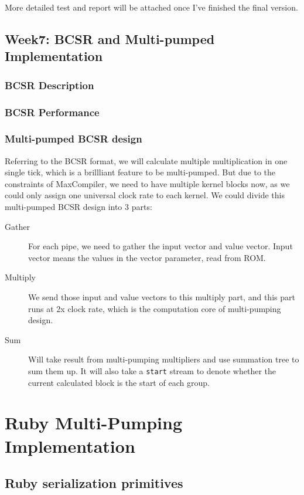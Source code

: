 \documentclass[a4paper, 10pt]{article}
\begin{document}
More detailed test and report will be attached once I've finished the final version.

\subsection{Week7: BCSR and Multi-pumped Implementation}

\subsubsection{BCSR Description}

\subsubsection{BCSR Performance}

\subsubsection{Multi-pumped BCSR design}

Referring to the BCSR format, we will calculate multiple multiplication in one single tick, which is a brillliant feature to be multi-pumped. But due to the constraints of MaxCompiler, we need to have multiple kernel blocks now, as we could only assign one universal clock rate to each kernel. We could divide this multi-pumped BCSR design into 3 parts:

\begin{description}
\item[Gather] For each pipe, we need to gather the input vector and value vector. Input vector means the values in the vector parameter, read from ROM. 
\item[Multiply] We send those input and value vectors to this multiply part, and this part runs at 2x clock rate, which is the computation core of multi-pumping design.
\item[Sum] Will take result from multi-pumping multipliers and use summation tree to sum them up. It will also take a \texttt{start} stream to denote whether the current calculated block is the start of each group.
\end{description}

\section{Ruby Multi-Pumping Implementation}

\subsection{Ruby serialization primitives}
\end{document}
